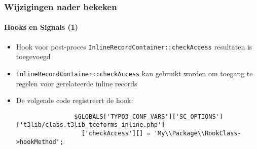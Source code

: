 \begin{frame}[fragile]
	\frametitle{Wijzigingen nader bekeken}
	\framesubtitle{Hooks en Signals (1)}

	\lstset{basicstyle=\tiny\ttfamily}

	\begin{itemize}

		\item Hook voor post-proces \texttt{InlineRecordContainer::checkAccess} resultaten is toegevoegd

		\item \texttt{InlineRecordContainer::checkAccess} kan gebruikt worden om toegang te regelen voor gerelateerde inline records

		\item De volgende code registreert de hook:

			\begin{lstlisting}
				$GLOBALS['TYPO3_CONF_VARS']['SC_OPTIONS']['t3lib/class.t3lib_tceforms_inline.php']
				  ['checkAccess'][] = 'My\\Package\\HookClass->hookMethod';
			\end{lstlisting}

	\end{itemize}

\end{frame}


